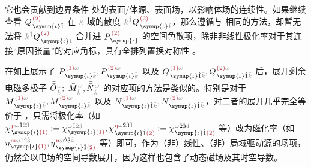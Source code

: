 它也会贡献到边界条件  处的表面/体源、表面场，以影响体场的连续性。如果继续查看 $Q^{\;\! \textcolor{Maroon}{(2)}}_{\;\! \symup{\iota} \hat{1}}$ 在 $\mathcolor{gray}{\bar{\kappa}}$ 域的散度 $\mathcolor{gray}{k^{\hat{1}}} Q^{\;\! \textcolor{Maroon}{(2)}}_{\;\! \symup{\iota} \mathcolor{gray}{\hat{1}}}$，那么遵循与  相同的方法，却暂无法将 $\mathcolor{gray}{k^{\hat{1}}} Q^{\;\! \textcolor{Maroon}{(2)}}_{\;\! \symup{\iota} \mathcolor{gray}{\hat{1}}}$ 合并进 $P^{\;\! \textcolor{Maroon}{(2)}}_{\;\! \symup{\iota}}$ 的空间色散项，除非非线性极化率对于其连接“原因张量”的对应角标，具有全排列置换对称性 。

在如上展示了 $P^{\;\! \textcolor{Maroon}{(1)} \mathcolor{gray}{\omega}}_{\;\! \symup{\iota}\mathcolor{gray}{\bar{k}}}, P^{\;\! \textcolor{Maroon}{(2)} \mathcolor{gray}{\omega}}_{\;\! \symup{\iota}\mathcolor{gray}{\bar{k}}}$ 以及 $Q^{\;\! \textcolor{Maroon}{(1)} \mathcolor{gray}{\omega}}_{\;\! \symup{\iota} \hat{1} \mathcolor{gray}{\bar{k}}}, Q^{\;\! \textcolor{Maroon}{(2)} \mathcolor{gray}{\omega}}_{\;\! \symup{\iota} \hat{1} \mathcolor{gray}{\bar{k}}}$ 后，展开剩余电磁多极子 $\bar{\bar{\bar{O}}}^{\;\!\mathcolor{gray}{\omega}}_{\;\!\mathcolor{gray}{\bar{k}}};$ $ \bar{M}^{\;\!\mathcolor{gray}{\omega}}_{\;\!\mathcolor{gray}{\bar{k}}},\bar{\bar{N}}^{\;\!\mathcolor{gray}{\omega}}_{\;\!\mathcolor{gray}{\bar{k}}}$ 的对应项的方法是类似的。特别是对于 $M^{\;\! \textcolor{Maroon}{(1)} \mathcolor{gray}{\omega}}_{\;\! \symup{\iota}\mathcolor{gray}{\bar{k}}}, M^{\;\! \textcolor{Maroon}{(2)} \mathcolor{gray}{\omega}}_{\;\! \symup{\iota}\mathcolor{gray}{\bar{k}}}$ 以及 $N^{\;\! \textcolor{Maroon}{(1)} \mathcolor{gray}{\omega}}_{\;\! \symup{\iota} \hat{1} \mathcolor{gray}{\bar{k}}}, N^{\;\! \textcolor{Maroon}{(2)} \mathcolor{gray}{\omega}}_{\;\! \symup{\iota} \hat{1} \mathcolor{gray}{\bar{k}}}$，对二者的展开几乎完全等价于 ，只需将极化率（如 $\chi^{\;\! \textcolor{Maroon}{\text{p}} \mathcolor{gray}{\omega} \hat{1} \mathcolor{gray}{\hat{2} \hat{3}}}_{\;\! \symup{\iota} \textcolor{Maroon}{(1)}} := \chi^{\;\! \mathcolor{gray}{\omega} \hat{1} \mathcolor{gray}{\hat{2} \hat{3}}}_{\;\! \symup{\iota} \textcolor{Maroon}{(1)}}, \chi^{\;\! \textcolor{Maroon}{\text{q}} \mathcolor{gray}{\omega} \hat{2} \hat{3} \mathcolor{gray}{\hat{4}}}_{\;\! \symup{\iota} \hat{1} \textcolor{Maroon}{(2)}} := \dot{\chi}^{\;\! \mathcolor{gray}{\omega} \hat{2} \hat{3} \mathcolor{gray}{\hat{4}}}_{\;\! \symup{\iota} \hat{1} \textcolor{Maroon}{(2)}}$ 等）改为磁化率（如 $\eta^{\;\! \textcolor{Maroon}{\text{m}} \mathcolor{gray}{\omega} \hat{1} \mathcolor{gray}{\hat{2} \hat{3}}}_{\;\! \symup{\iota} \textcolor{Maroon}{(1)}}, \eta^{\;\! \textcolor{Maroon}{\text{n}} \mathcolor{gray}{\omega} \hat{2} \hat{3} \mathcolor{gray}{\hat{4}}}_{\;\! \symup{\iota} \hat{1} \textcolor{Maroon}{(2)}}$ 等）即可，作为（非）线性、（非）局域驱动源的场项，仍然全以电场的空间导数展开，因为这样也包含了动态磁场及其时空导数\cite{vandendriesscheInfluenceMagneticFields2014}。

